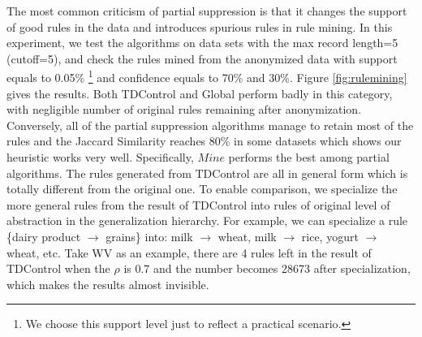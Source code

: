 The most common criticism of partial suppression is that it
changes the support of good rules in the data and introduces spurious
rules in rule mining. In this experiment, we test the algorithms on
data sets with the max record length=5 (cutoff=5),
and check the rules mined from the anonymized data
with support equals to 0.05\% \footnote{We choose this support level just to
reflect a practical scenario.} and confidence equals to 70\% and 30\%.
Figure \ref{fig:rulemining} gives the results.
Both TDControl and Global perform badly in this category, with
negligible number of original rules remaining after anonymization.
Conversely, all of the partial
suppression algorithms manage to retain most of the rules and the Jaccard Similarity reaches 80\% in some datasets which shows
our heuristic works very well. 
Specifically, $Mine$ performs the best among partial algorithms. 
The rules generated from TDControl are all in general form which is
totally different from the original one. To enable comparison,
we specialize the more general rules from the result of TDControl
into rules of original level of abstraction in the generalization hierarchy.
For example, we can specialize a rule \{dairy product $\rightarrow$ grains\}
into:
\rm{milk} $\rightarrow$ \rm{wheat}, 
\rm{milk} $\rightarrow$ \rm{rice}, 
\rm{yogurt} $\rightarrow$ \rm{wheat}, etc. 
Take WV as an example, there are 4 rules left in the result of TDControl when
the $\rho$ is 0.7 and the number becomes 28673 after specialization, which makes
the results almost invisible.

